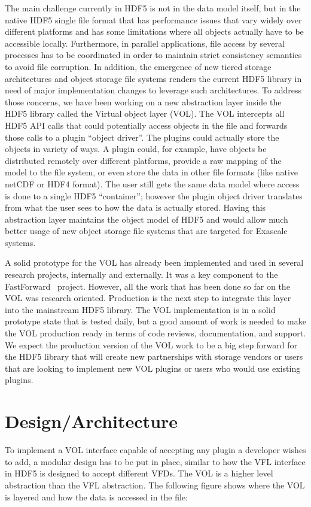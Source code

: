 \documentclass[letterpaper,hyper]{THG_RFC}
\begin{document}
The main challenge currently in HDF5 is not in the data model itself, but in the native HDF5 single file format that has performance issues that vary widely over different platforms and has some limitations where all objects actually have to be accessible locally. Furthermore, in parallel applications, file access by several processes has to be coordinated in order to maintain strict consistency semantics to avoid file corruption. In addition, the emergence of new tiered storage architectures and object storage file systems renders the current HDF5 library in need of major implementation changes to leverage such architectures.
To address those concerns, we have been working on a new abstraction layer inside the HDF5 library called the Virtual object layer (VOL). The VOL intercepts all HDF5 API calls that could potentially access objects in the file and forwards those calls to a plugin ``object driver''. The plugins could actually store the objects in variety of ways. A plugin could, for example, have objects be distributed remotely over different platforms, provide a raw mapping of the model to the file system, or even store the data in other file formats (like native netCDF or HDF4 format). The user still gets the same data model where access is done to a single HDF5 ``container''; however the plugin object driver translates from what the user sees to how the data is actually stored. Having this abstraction layer maintains the object model of HDF5 and would allow much better usage of new object storage file systems that are targeted for Exascale systems. 

A solid prototype for the VOL has already been implemented and used in several research projects, internally and externally. It was a key component to the FastForward~\cite{ffwd} project. However, all the work that has been done so far on the VOL was research oriented. Production is the next step to integrate this layer into the mainstream HDF5 library. The VOL implementation is in a solid prototype state that is tested daily, but a good amount of work is needed to make the VOL production ready in terms of code reviews, documentation, and support. We expect the production version of the VOL work to be a big step forward for the HDF5 library that will create new partnerships with storage vendors or users that are looking to implement new VOL plugins or users who would use existing plugins.


\section{Design/Architecture}
To implement a VOL interface capable of accepting any plugin a developer wishes to add, a modular design has to be put in place, similar to how the VFL interface in HDF5 is designed to accept different VFDs. The VOL is a higher level abstraction than the VFL abstraction. The following figure shows where the VOL is layered and how the data is accessed in the file:
\end{document}
